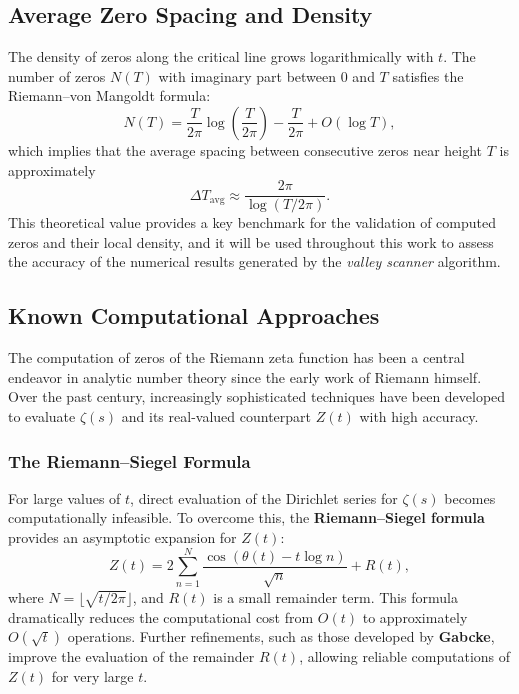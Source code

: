 \documentclass[11pt,a4paper]{article}
\begin{document}
\subsection{Average Zero Spacing and Density}

The density of zeros along the critical line grows logarithmically with \( t \).  
The number of zeros \( N(T) \) with imaginary part between \( 0 \) and \( T \) satisfies the Riemann–von Mangoldt formula:
\[
N(T) = \frac{T}{2\pi} \log\!\left(\frac{T}{2\pi}\right) - \frac{T}{2\pi} + O(\log T),
\]
which implies that the average spacing between consecutive zeros near height \( T \) is approximately
\[
\Delta T_{\text{avg}} \approx \frac{2\pi}{\log(T / 2\pi)}.
\]
This theoretical value provides a key benchmark for the validation of computed zeros and their local density, and it will be used throughout this work to assess the accuracy of the numerical results generated by the \emph{valley scanner} algorithm.

\subsection{Known Computational Approaches}
\label{subsec:known-approaches}

The computation of zeros of the Riemann zeta function has been a central endeavor in analytic number theory since the early work of Riemann himself. Over the past century, increasingly sophisticated techniques have been developed to evaluate \( \zeta(s) \) and its real-valued counterpart \( Z(t) \) with high accuracy.

\subsubsection*{The Riemann--Siegel Formula}

For large values of \( t \), direct evaluation of the Dirichlet series for \( \zeta(s) \) becomes computationally infeasible.  
To overcome this, the \textbf{Riemann–Siegel formula} provides an asymptotic expansion for \( Z(t) \):
\[
Z(t) = 2 \sum_{n=1}^{N} \frac{\cos(\theta(t) - t \log n)}{\sqrt{n}} + R(t),
\]
where \( N = \lfloor \sqrt{t / 2\pi} \rfloor \), and \( R(t) \) is a small remainder term.  
This formula dramatically reduces the computational cost from \( O(t) \) to approximately \( O(\sqrt{t}) \) operations.  
Further refinements, such as those developed by \textbf{Gabcke}, improve the evaluation of the remainder \( R(t) \), allowing reliable computations of \( Z(t) \) for very large \( t \).
\end{document}
